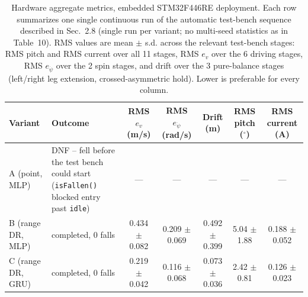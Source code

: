 \begin{table}[H]
\caption{Hardware aggregate metrics, embedded STM32F446RE deployment. Each row summarizes one single continuous run of the automatic test-bench sequence described in Sec.~2.8 (single run per variant; no multi-seed statistics as in Table~10). RMS values are mean $\pm$ s.d. across the relevant test-bench stages: RMS pitch and RMS current over all 11 stages, RMS $e_v$ over the 6 driving stages, RMS $e_{\dot\psi}$ over the 2 spin stages, and drift over the 3 pure-balance stages (left/right leg extension, crossed-asymmetric hold). Lower is preferable for every column.}
\begin{tabularx}{\textwidth}{lXccccc}
\toprule
Variant & Outcome & RMS $e_v$ (m/s) & RMS $e_{\dot\psi}$ (rad/s) & Drift (m) & RMS pitch ($^\circ$) & RMS current (A) \\
\midrule
A (point, MLP) & DNF -- fell before the test bench could start (\texttt{isFallen()} blocked entry past \texttt{idle}) & --- & --- & --- & --- & --- \\
B (range DR, MLP) & completed, 0 falls & 0.434 $\pm$ 0.082 & 0.209 $\pm$ 0.069 & 0.492 $\pm$ 0.399 & 5.04 $\pm$ 1.88 & 0.188 $\pm$ 0.052 \\
C (range DR, GRU) & completed, 0 falls & 0.219 $\pm$ 0.042 & 0.116 $\pm$ 0.068 & 0.073 $\pm$ 0.036 & 2.42 $\pm$ 0.81 & 0.126 $\pm$ 0.023 \\
\bottomrule
\end{tabularx}
\label{tab:hw-aggregate}
\end{table}
